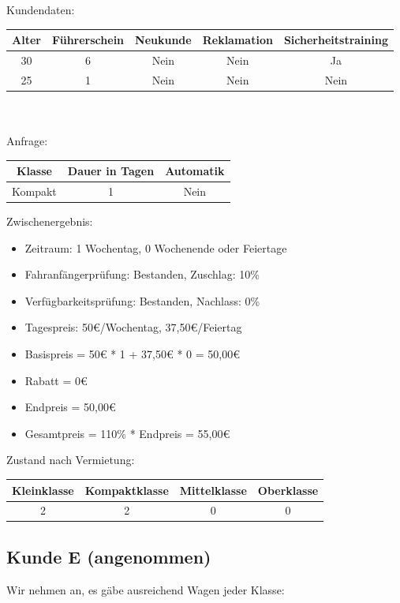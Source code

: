 Kundendaten:\\
\begin{tabular}{|c|c|c|c|c|}
	\hline \textbf{Alter} & \textbf{Führerschein} & \textbf{Neukunde} & \textbf{Reklamation} & \textbf{Sicherheitstraining} \\ 
	\hline 30 & 6 & Nein & Nein & Ja \\ 
	\hline 25 & 1 & Nein & Nein & Nein \\ 
	\hline 
\end{tabular} 
\\\\
Anfrage:\\
\begin{tabular}{|c|c|c|}
	\hline \textbf{Klasse} & \textbf{Dauer in Tagen} & \textbf{Automatik} \\ 
	\hline Kompakt & 1 & Nein \\ 
	\hline 
\end{tabular}

Zwischenergebnis:
\begin{itemize}
	\item Zeitraum: 1 Wochentag, 0 Wochenende oder Feiertage
	\item Fahranfängerprüfung: Bestanden, Zuschlag: 10\%
	\item Verfügbarkeitsprüfung: Bestanden, Nachlass: 0\%
	\item Tagespreis: 50€/Wochentag, 37,50€/Feiertag
	\item Basispreis = 50€ * 1 + 37,50€ * 0 = 50,00€
	\item Rabatt = 0€
	\item Endpreis = 50,00€
	\item Gesamtpreis = 110\% * Endpreis = 55,00€
\end{itemize}

Zustand nach Vermietung:\\
\begin{tabular}{|c|c|c|c|}
	\hline \textbf{Kleinklasse} & \textbf{Kompaktklasse} & \textbf{Mittelklasse} & \textbf{Oberklasse}  \\ 
	\hline 2 & 2 & 0 & 0 \\ 
	\hline 
\end{tabular}

\subsection{Kunde E (angenommen)}

Wir nehmen an, es gäbe ausreichend Wagen jeder Klasse:


